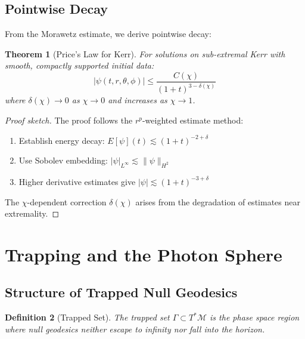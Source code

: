 \documentclass[12pt,a4paper]{article}
\newtheorem{theorem}{Theorem}[section]
\newtheorem{definition}[theorem]{Definition}
\newcommand{\M}{\mathcal{M}}
\begin{document}
\subsection{Pointwise Decay}

From the Morawetz estimate, we derive pointwise decay:

\begin{theorem}[Price's Law for Kerr]\label{thm:price}
For solutions on sub-extremal Kerr with smooth, compactly supported initial data:
\begin{equation}
|\psi(t, r, \theta, \phi)| \leq \frac{C(\chi)}{(1+t)^{3-\delta(\chi)}}
\end{equation}
where $\delta(\chi) \to 0$ as $\chi \to 0$ and increases as $\chi \to 1$.
\end{theorem}

\begin{proof}[Proof sketch]
The proof follows the $r^p$-weighted estimate method:
\begin{enumerate}
    \item Establish energy decay: $E[\psi](t) \lesssim (1+t)^{-2+\delta}$
    \item Use Sobolev embedding: $|\psi|_{L^\infty} \lesssim \|\psi\|_{H^2}$
    \item Higher derivative estimates give $|\psi| \lesssim (1+t)^{-3+\delta}$
\end{enumerate}

The $\chi$-dependent correction $\delta(\chi)$ arises from the degradation of estimates near extremality.
\end{proof}

\section{Trapping and the Photon Sphere}\label{sec:trapping-section}

\subsection{Structure of Trapped Null Geodesics}

\begin{definition}[Trapped Set]
The trapped set $\Gamma \subset T^*\M$ is the phase space region where null geodesics neither escape to infinity nor fall into the horizon.
\end{definition}
\end{document}
